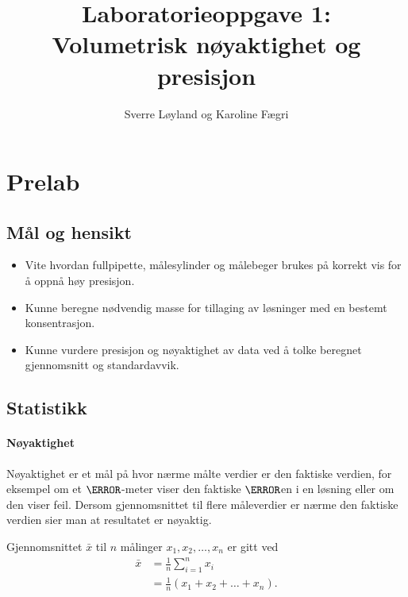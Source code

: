 


\title{Laboratorieoppgave 1:\\
Volumetrisk nøyaktighet og presisjon}
\author{Sverre Løyland og Karoline Fægri}
\date{}


			
	\maketitle
	
	\section{Prelab}
	
	\subsection{Mål og hensikt}
	\begin{itemize}
		\item Vite hvordan fullpipette, målesylinder og målebeger brukes på korrekt vis for å oppnå høy presisjon.
		
		\item Kunne beregne nødvendig masse for tillaging av løsninger med en bestemt konsentrasjon.
		
		\item Kunne vurdere presisjon og nøyaktighet av data ved å tolke beregnet gjennomsnitt og standardavvik.
	\end{itemize}
	
	\subsection{Statistikk}
	
	\paragraph{Nøyaktighet}
	Nøyaktighet er et mål på hvor nærme målte verdier er den faktiske verdien, for eksempel om et $\pH$-meter viser den faktiske $\pH$en i en løsning eller om den viser feil. Dersom gjennomsnittet til flere måleverdier er nærme den faktiske verdien sier man at resultatet er nøyaktig.
	
	Gjennomsnittet $\bar{x}$ til $n$ målinger $x_1, x_2, \ldots, x_n$ er gitt ved
	\begin{align*}
		\bar{x} &= \frac{1}{n}\sum_{i=1}^{n}x_i\\
		&=\frac{1}{n}\left(x_1 + x_2 + \dots + x_n\right).
	\end{align*}
	
